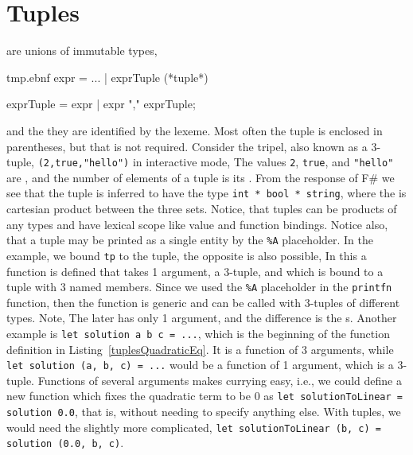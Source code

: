 \section{Tuples}
 are unions of immutable types, 
%
\begin{verbatimwrite}{tmp.ebnf}
expr = ... 
  | exprTuple (*tuple*)

exprTuple = expr | expr "," exprTuple;
\end{verbatimwrite}
%
and the they are identified by the \lexeme{,} lexeme. Most often the tuple is enclosed in parentheses, but that is not required. Consider the tripel, also known as a 3-tuple, \lstinline!(2,true,"hello")! in interactive mode,
%
%
The values \lstinline!2!, \lstinline!true!, and \lstinline!"hello"! are , and the number of elements of a tuple is its . From the response of F\# we see that the tuple is inferred to have the type \lstinline!int * bool * string!, where the \lexeme{*} is cartesian product between the three sets.  Notice, that tuples can be products of any types and have lexical scope like value and function bindings. Notice also, that a tuple may be printed as a single entity by the \lstinline!%A! placeholder. In the example, we bound \lstinline!tp! to the tuple, the opposite is also possible,
%
%
In this a function is defined that takes 1 argument, a 3-tuple, and which is bound to a tuple with 3 named members. Since we used the \lstinline!%A! placeholder in the \lstinline!printfn! function, then the function is generic and can be called with 3-tuples of different types. Note,   The later has only 1 argument, and the difference is the \lexeme{,}s. Another example is \lstinline!let solution a b c = ...!, which is the beginning of the function definition in Listing~\ref{tuplesQuadraticEq}. It is a function of 3 arguments, while \lstinline!let solution (a, b, c) = ...! would be a function of 1 argument, which is a 3-tuple. Functions of several arguments makes currying easy, i.e., we could define a new function which fixes the quadratic term to be 0 as \lstinline!let solutionToLinear = solution 0.0!, that is, without needing to specify anything else. With tuples, we would need the slightly more complicated, \lstinline!let solutionToLinear (b, c) = solution (0.0, b, c)!.

